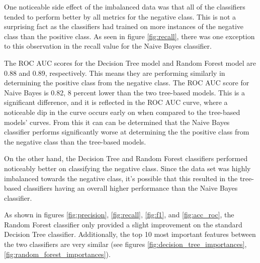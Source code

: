 \documentclass[10pt, conference, compsocconf]{IEEEtran}
\begin{document}
One noticeable side effect of the imbalanced data was that all of the classifiers tended to perform better by all metrics for the negative class. This is not a surprising fact as the classifiers had trained on more instances of the negative class than the positive class. As seen in figure \ref{fig:recall}, there was one exception to this observation in the recall value for the Naive Bayes classifier.

The ROC AUC scores for the Decision Tree model and Random Forest model are 0.88 and 0.89, respectively. This means they are performing similarly in determining the positive class from the negative class. The ROC AUC score for Naive Bayes is 0.82, 8 percent lower than the two tree-based models. This is a significant difference, and it is reflected in the ROC AUC curve, where a noticeable dip in the curve occurs early on when compared to the tree-based models' curves. From this it can can be determined that the Naive Bayes classifier performs significantly worse at determining the the positive class from the negative class than the tree-based models.

On the other hand, the Decision Tree and Random Forest classifiers performed noticeably better on classifying the negative class. Since the data set was highly imbalanced towards the negative class, it's possible that this resulted in the tree-based classifiers having an overall higher performance than the Naive Bayes classifier.

As shown in figures \ref{fig:precision}, \ref{fig:recall}, \ref{fig:f1}, and \ref{fig:acc_roc}, the Random Forest classifier only provided a slight improvement on the standard Decision Tree classifier. Additionally, the top 10 most important features between the two classifiers are very similar (see figures \ref{fig:decision_tree_importances}, \ref{fig:random_forest_importances}).


\end{document}
